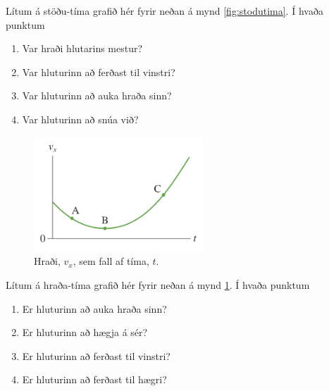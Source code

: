 \ifdefined \wholebook \else\documentclass[oneside]{book}\usepackage{EdlBook}\graphicspath{{figures/}}
\begin{document}
\begin{enumerate}[label = \textbf{Dæmi \thechapter.\arabic*.}]
\begin{minipage}{\linewidth}
\item Lítum á stöðu-tíma grafið hér fyrir neðan á mynd \ref{fig:stodutima}. Í hvaða punktum
\begin{enumerate}[label = \textbf{(\alph*)}]
    \item Var hraði hlutarins mestur?
    \item Var hluturinn að ferðast til vinstri?
    \item Var hluturinn að auka hraða sinn?
    \item Var hluturinn að snúa við?
\end{enumerate}

\end{minipage}

\vspace{1cm}

\begin{minipage}{\linewidth}

\begin{figure}
\vspace{-1cm}
\centering
\includegraphics[width=2.5in]{images/hradatima.png}
\caption{Hraði, $v_x$, sem fall af tíma, $t$.}
\label{fig:hradatima}


\end{figure}

\item Lítum á hraða-tíma grafið hér fyrir neðan á mynd \ref{fig:hradatima}. Í hvaða punktum
\begin{enumerate}[label = \textbf{(\alph*)}]
    \item Er hluturinn að auka hraða sinn?
    \item Er hluturinn að hægja á sér?
    \item Er hluturinn að ferðast til vinstri?
    \item Er hluturinn að ferðast til hægri?
\end{enumerate}

\end{minipage}

\vspace{1cm}


\end{enumerate}
\end{document}
